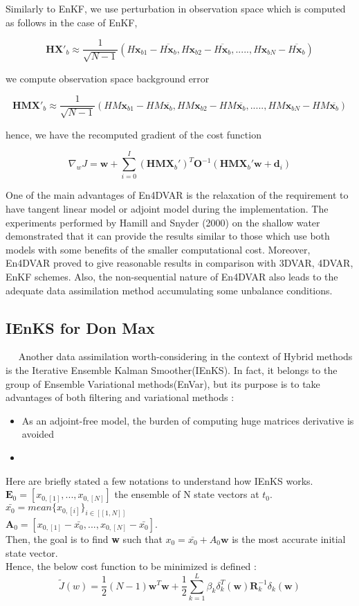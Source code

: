 \documentclass[a4,12pt]{article}
\begin{document}
Similarly to EnKF, we use perturbation in observation space which is computed as follows in the case of EnKF,

$$\textbf{HX}'_{b} \approx \frac{1}{\sqrt{N-1}}(H\textbf{x}_{b1}-\overline{H\textbf{x}_{b}},H\textbf{x}_{b2}-\overline{H\textbf{x}_{b}},.....,H\textbf{x}_{bN}-\overline{H\textbf{x}_{b}})$$

we compute observation space background error

$$\textbf{HMX}'_{b} \approx \frac{1}{\sqrt{N-1}}(HM\textbf{x}_{b1}-HM\overline{\textbf{x}_{b}}, HM\textbf{x}_{b2}-HM\overline{\textbf{x}_{b}},.....,HM\textbf{x}_{bN}-HM\overline{\textbf{x}_{b}} )$$

hence, we have the recomputed gradient of the cost function

$$\nabla _{w}J = \textbf{w} + \sum_{i=0}^{I}(\textbf{HMX}_{b}')^{T}\textbf{O}^{-1}(\textbf{HMX}_{b}'\textbf{w}+\textbf{d}_{i})$$


One of the main advantages of En4DVAR is the relaxation of the requirement to have tangent linear model or adjoint model during the implementation. The experiments performed by Hamill and Snyder (2000) on the shallow water demonstrated that it can  provide the results similar to those which use both models with some benefits of the smaller computational cost. Moreover, En4DVAR proved to give reasonable results in comparison with 3DVAR, 4DVAR, EnKF schemes. Also, the non-sequential nature of En4DVAR also leads to the adequate data assimilation method accumulating some unbalance conditions.  


\subsection{IEnKS for Don Max}
~~ Another data assimilation worth-considering in the context of Hybrid methods is the Iterative Ensemble Kalman Smoother(IEnKS). In fact, it belongs to the group of Ensemble Variational methods(EnVar), but its purpose is to take advantages of both filtering and variational methods :
\begin{itemize}
\item As an adjoint-free model, the burden of computing huge matrices derivative is avoided
\item 
\end{itemize}

Here are briefly stated a few notations to understand how IEnKS works. \\
$\textbf{E}_0 = [x_{0,[1]},...,x_{0,[N]}]$ the ensemble of N state vectors at $t_0$. \\
$\bar{x_0} = mean\{x_{0,[i]}\}_{i \in [\![1,N]\!] }$ \\
$\textbf{A}_0 = [x_{0,[1]} - \bar{x_0},...,x_{0,[N]}- \bar{x_0}]$. \\
Then, the goal is to find \textbf{w} such that $x_0 = \bar{x_0} + A_0 \textbf{w}$ is the most accurate initial state vector. \\
Hence, the below cost function to be minimized is defined : 
$$\tilde{J}(w) = \frac{1}{2}(N-1)\textbf{w}^{T}\textbf{w} + \frac{1}{2}\sum_{k=1}^{L}\beta_{k}\delta_{k}^{T}(\textbf{w})\textbf{R}_{k}^{-1}\delta_{k}(\textbf{w})$$
\end{document}
